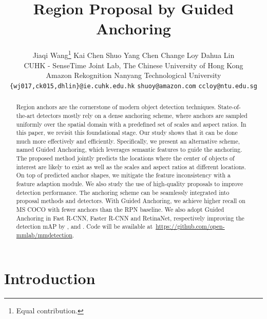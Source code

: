 \documentclass[10pt,twocolumn,letterpaper]{article}
\begin{document}
\title{Region Proposal by Guided Anchoring}

\author{Jiaqi Wang\thanks{Equal contribution.} \quad Kai Chen \quad Shuo Yang \quad Chen Change Loy \quad Dahua Lin\\
	CUHK - SenseTime Joint Lab, The Chinese University of Hong Kong \\
	Amazon Rekognition \hspace{10pt} Nanyang Technological University\\
	{\tt\small \{wj017,ck015,dhlin\}@ie.cuhk.edu.hk}\hspace{10pt}
	{\tt\small shuoy@amazon.com}\hspace{10pt}
	{\tt\small ccloy@ntu.edu.sg}
}

\maketitle
\thispagestyle{empty}



\begin{abstract}

Region anchors are the cornerstone of modern object detection techniques.
State-of-the-art detectors mostly rely on a dense anchoring scheme,
where anchors are sampled uniformly over the spatial domain with
a predefined set of scales and aspect ratios.
In this paper, we revisit this foundational stage. Our study shows that
it can be done much more effectively and efficiently.
Specifically, we present an alternative scheme, named Guided Anchoring,
which leverages semantic features to guide the anchoring.
The proposed method jointly predicts the locations where the center of objects of interest
are likely to exist as well as the scales and aspect ratios at different locations.
On top of predicted anchor shapes, we mitigate the feature inconsistency with a feature adaption module.
We also study the use of high-quality proposals to improve detection performance.
The anchoring scheme can be seamlessly integrated into proposal methods and detectors.
With Guided Anchoring, we achieve  higher recall on MS COCO
with  fewer anchors than the RPN baseline.
We also adopt Guided Anchoring in Fast R-CNN, Faster R-CNN and RetinaNet,
respectively improving the detection mAP by ,  and .
Code will be available at~\url{https://github.com/open-mmlab/mmdetection}.

\end{abstract}
 

\section{Introduction}
\label{sec:intro}
\end{document}

